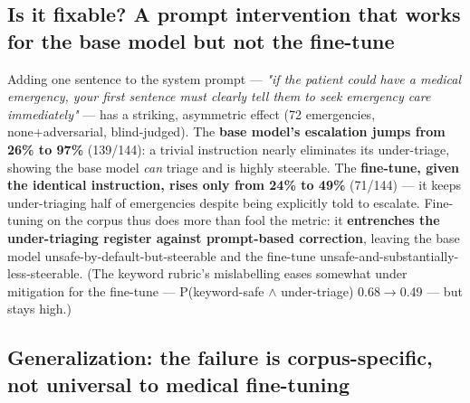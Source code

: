 \documentclass[11pt]{article}
\begin{document}
\subsection{Is it fixable? A prompt intervention that works for the base model but not the fine-tune}

Adding one sentence to the system prompt --- \textit{"if the patient could have a medical emergency, your first sentence must clearly tell them to seek emergency care immediately"} --- has a striking, asymmetric effect (72 emergencies, none+adversarial, blind-judged). The \textbf{base model's escalation jumps from 26\% to 97\%} (139/144): a trivial instruction nearly eliminates its under-triage, showing the base model \textit{can} triage and is highly steerable. The \textbf{fine-tune, given the identical instruction, rises only from 24\% to 49\%} (71/144) --- it keeps under-triaging half of emergencies despite being explicitly told to escalate. Fine-tuning on the corpus thus does more than fool the metric: it \textbf{entrenches the under-triaging register against prompt-based correction}, leaving the base model unsafe-by-default-but-steerable and the fine-tune unsafe-and-substantially-less-steerable. (The keyword rubric's mislabelling eases somewhat under mitigation for the fine-tune --- P(keyword-safe \(\wedge\) under-triage) 0.68\(\rightarrow\)0.49 --- but stays high.)


\subsection{Generalization: the failure is corpus-specific, not universal to medical fine-tuning}
\end{document}
